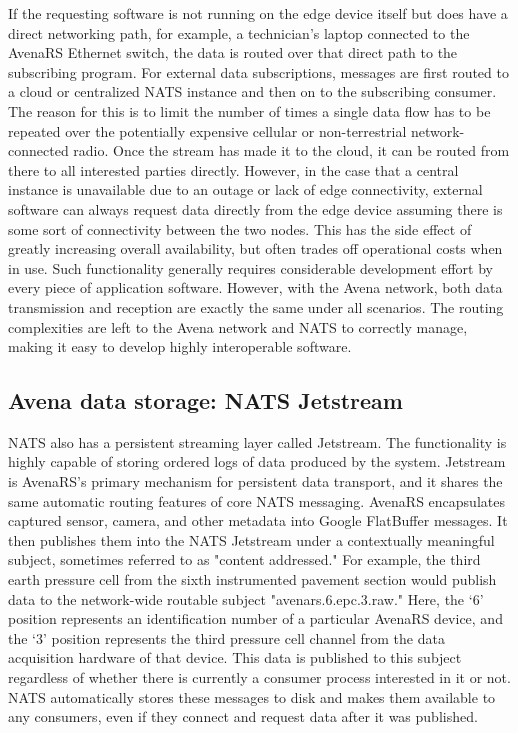 \documentclass[conference]{IEEEtran}
\begin{document}
If the requesting software is not running on the edge device itself but does have a direct networking path, for example, a technician's laptop connected to the AvenaRS Ethernet switch, the data is routed over that direct path to the subscribing program.
For external data subscriptions, messages are first routed to a cloud or centralized NATS instance and then on to the subscribing consumer.
The reason for this is to limit the number of times a single data flow has to be repeated over the potentially expensive cellular or non-terrestrial network-connected radio.
Once the stream has made it to the cloud, it can be routed from there to all interested parties directly.
However, in the case that a central instance is unavailable due to an outage or lack of edge connectivity, external software can always request data directly from the edge device assuming there is some sort of connectivity between the two nodes.
This has the side effect of greatly increasing overall availability, but often trades off operational costs when in use.
Such functionality generally requires considerable development effort by every piece of application software.
However, with the Avena network, both data transmission and reception are exactly the same under all scenarios. 
The routing complexities are left to the Avena network and NATS to correctly manage, making it easy to develop highly interoperable software.

\subsection{Avena data storage: NATS Jetstream}
NATS also has a persistent streaming layer called Jetstream.
The functionality is highly capable of storing ordered logs of data produced by the system.
Jetstream is AvenaRS's primary mechanism for persistent data transport, and it shares the same automatic routing features of core NATS messaging.
AvenaRS encapsulates captured sensor, camera, and other metadata into Google FlatBuffer messages.
It then publishes them into the NATS Jetstream under a contextually meaningful subject, sometimes referred to as "content addressed."
For example, the third earth pressure cell from the sixth instrumented pavement section would publish data to the network-wide routable subject "avenars.6.epc.3.raw."
Here, the `6' position represents an identification number of a particular AvenaRS device, and the `3' position represents the third pressure cell channel from the data acquisition hardware of that device.
This data is published to this subject regardless of whether there is currently a consumer process interested in it or not.
NATS automatically stores these messages to disk and makes them available to any consumers, even if they connect and request data after it was published.
\end{document}

